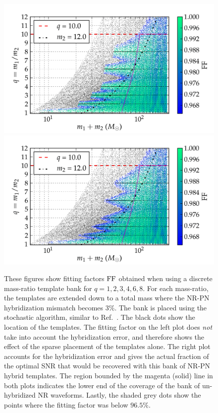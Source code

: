\begin{figure}
\begin{center}
\includegraphics[width=\columnwidth]{bank001_lowM_01_stochastic_mtot200_logMq_NOhybMM-tiny.png}
\includegraphics[width=\columnwidth]{bank001_lowM_01_stochastic_mtot200_logMq_hybMM-tiny.png}
\caption{\label{fig:Current-hybrids-stochastic-FF}These figures show fitting
  factors $\mathrm{FF}$ obtained when using a discrete mass-ratio template bank for
  $q=1,2,3,4,6,8$. For each mass-ratio, the templates are extended down 
  to a total mass where the NR-PN hybridization mismatch becomes
  $3\%$. The bank is placed using the stochastic algorithm, similar to 
  Ref.~\cite{Harry:2009ea,Ajith:2012mn,Manca:2009xw}. 
  The black dots show the location
  of the templates. The fitting factor on the left plot does 
  {\em not} take into account the hybridization error, and therefore shows the
  effect of the sparse placement of the templates alone. 
  The right plot accounts for the hybridization error
  and gives the actual fraction of the optimal SNR that would be recovered
  with this bank of NR-PN hybrid templates. The region bounded by the magenta 
  (solid) line in both plots indicates the lower end of the coverage of the 
  bank of un-hybridized NR waveforms. Lastly, the shaded grey dots show the 
  points where the fitting factor was below $96.5\%$.}
\end{center}
\end{figure}

